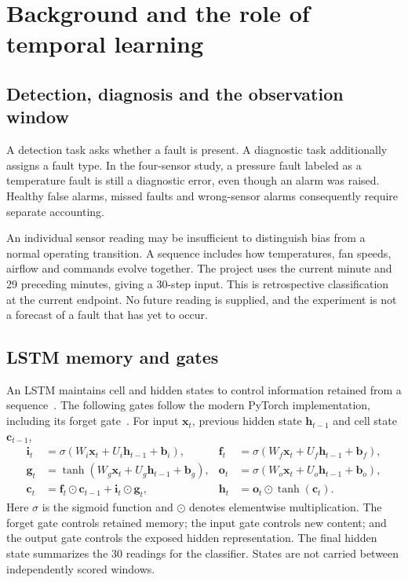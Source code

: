 \section{Background and the role of temporal learning}
\subsection{Detection, diagnosis and the observation window}
A detection task asks whether a fault is present. A diagnostic task additionally assigns a fault type. In the four-sensor study, a pressure fault labeled as a temperature fault is still a diagnostic error, even though an alarm was raised. Healthy false alarms, missed faults and wrong-sensor alarms consequently require separate accounting.

An individual sensor reading may be insufficient to distinguish bias from a normal operating transition. A sequence includes how temperatures, fan speeds, airflow and commands evolve together. The project uses the current minute and 29 preceding minutes, giving a 30-step input. This is retrospective classification at the current endpoint. No future reading is supplied, and the experiment is not a forecast of a fault that has yet to occur.

\subsection{LSTM memory and gates}
An LSTM maintains cell and hidden states to control information retained from a sequence~\cite{hochreiter1997}. The following gates follow the modern PyTorch implementation, including its forget gate~\cite{pytorch}. For input $\mathbf{x}_t$, previous hidden state $\mathbf{h}_{t-1}$ and cell state $\mathbf{c}_{t-1}$,
\begin{align}
\mathbf{i}_t &= \sigma(W_i\mathbf{x}_t+U_i\mathbf{h}_{t-1}+\mathbf{b}_i), &
\mathbf{f}_t &= \sigma(W_f\mathbf{x}_t+U_f\mathbf{h}_{t-1}+\mathbf{b}_f),\\
\mathbf{g}_t &= \tanh(W_g\mathbf{x}_t+U_g\mathbf{h}_{t-1}+\mathbf{b}_g), &
\mathbf{o}_t &= \sigma(W_o\mathbf{x}_t+U_o\mathbf{h}_{t-1}+\mathbf{b}_o),\\
\mathbf{c}_t &= \mathbf{f}_t\odot\mathbf{c}_{t-1}+\mathbf{i}_t\odot\mathbf{g}_t, &
\mathbf{h}_t &= \mathbf{o}_t\odot\tanh(\mathbf{c}_t).
\end{align}
Here $\sigma$ is the sigmoid function and $\odot$ denotes elementwise multiplication. The forget gate controls retained memory; the input gate controls new content; and the output gate controls the exposed hidden representation. The final hidden state summarizes the 30 readings for the classifier. States are not carried between independently scored windows.

